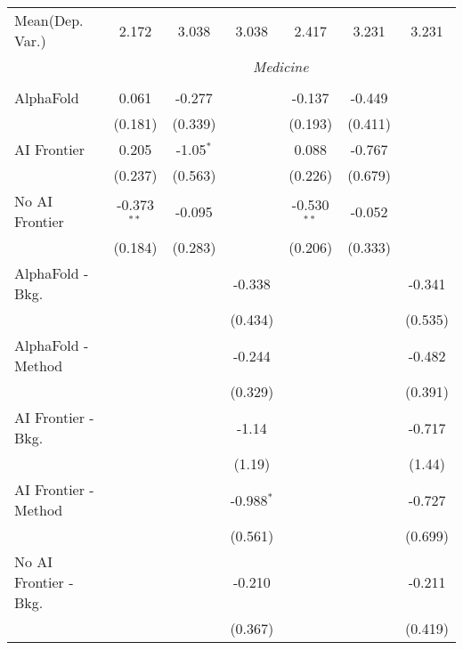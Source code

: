 \begin{tabular}{lcccccc}
Mean(Dep. Var.) & 2.172 & 3.038 & 3.038 & 2.417 & 3.231 & 3.231 \\
 & \multicolumn{6}{c}{\textit{Medicine}} \\ \\
   AlphaFold               & 0.061         & -0.277      &              & -0.137        & -0.449  &   \\   
                           & (0.181)       & (0.339)     &              & (0.193)       & (0.411) &   \\   
   AI Frontier             & 0.205         & -1.05$^{*}$ &              & 0.088         & -0.767  &   \\   
                           & (0.237)       & (0.563)     &              & (0.226)       & (0.679) &   \\   
   No AI Frontier          & -0.373$^{**}$ & -0.095      &              & -0.530$^{**}$ & -0.052  &   \\   
                           & (0.184)       & (0.283)     &              & (0.206)       & (0.333) &   \\   
   AlphaFold - Bkg.        &               &             & -0.338       &               &         & -0.341\\   
                           &               &             & (0.434)      &               &         & (0.535)\\   
   AlphaFold - Method      &               &             & -0.244       &               &         & -0.482\\   
                           &               &             & (0.329)      &               &         & (0.391)\\   
   AI Frontier - Bkg.      &               &             & -1.14        &               &         & -0.717\\   
                           &               &             & (1.19)       &               &         & (1.44)\\   
   AI Frontier - Method    &               &             & -0.988$^{*}$ &               &         & -0.727\\   
                           &               &             & (0.561)      &               &         & (0.699)\\   
   No AI Frontier - Bkg.   &               &             & -0.210       &               &         & -0.211\\   
                           &               &             & (0.367)      &               &         & (0.419)\\   

\end{tabular}
